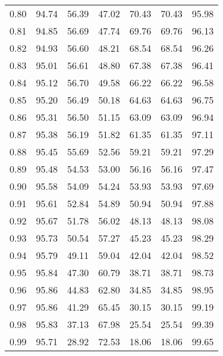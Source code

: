 \begin{tabular}{|c|c|c|c|c|c|c|}
      0.80 &     94.74 &     56.39 &      47.02 &   70.43 &      70.43 &         95.98 \\
      0.81 &     94.85 &     56.69 &      47.74 &   69.76 &      69.76 &         96.13 \\
      0.82 &     94.93 &     56.60 &      48.21 &   68.54 &      68.54 &         96.26 \\
      0.83 &     95.01 &     56.61 &      48.80 &   67.38 &      67.38 &         96.41 \\
      0.84 &     95.12 &     56.70 &      49.58 &   66.22 &      66.22 &         96.58 \\
      0.85 &     95.20 &     56.49 &      50.18 &   64.63 &      64.63 &         96.75 \\
      0.86 &     95.31 &     56.50 &      51.15 &   63.09 &      63.09 &         96.94 \\
      0.87 &     95.38 &     56.19 &      51.82 &   61.35 &      61.35 &         97.11 \\
      0.88 &     95.45 &     55.69 &      52.56 &   59.21 &      59.21 &         97.29 \\
      0.89 &     95.48 &     54.53 &      53.00 &   56.16 &      56.16 &         97.47 \\
      0.90 &     95.58 &     54.09 &      54.24 &   53.93 &      53.93 &         97.69 \\
      0.91 &     95.61 &     52.84 &      54.89 &   50.94 &      50.94 &         97.88 \\
      0.92 &     95.67 &     51.78 &      56.02 &   48.13 &      48.13 &         98.08 \\
      0.93 &     95.73 &     50.54 &      57.27 &   45.23 &      45.23 &         98.29 \\
      0.94 &     95.79 &     49.11 &      59.04 &   42.04 &      42.04 &         98.52 \\
      0.95 &     95.84 &     47.30 &      60.79 &   38.71 &      38.71 &         98.73 \\
      0.96 &     95.86 &     44.83 &      62.80 &   34.85 &      34.85 &         98.95 \\
      0.97 &     95.86 &     41.29 &      65.45 &   30.15 &      30.15 &         99.19 \\
      0.98 &     95.83 &     37.13 &      67.98 &   25.54 &      25.54 &         99.39 \\
      0.99 &     95.71 &     28.92 &      72.53 &   18.06 &      18.06 &         99.65 \\
\bottomrule
\end{tabular}
